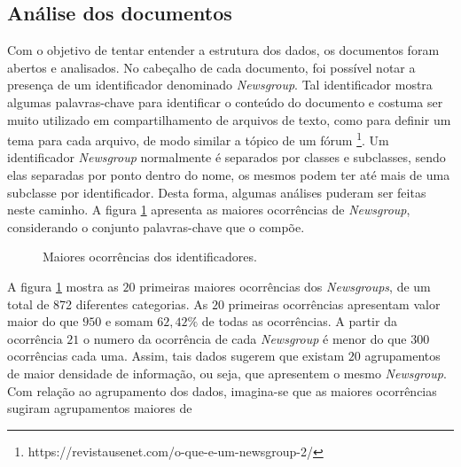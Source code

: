 \documentclass[conference]{IEEEtran}
\begin{document}
\subsection{Análise dos documentos}

Com o objetivo de tentar entender a estrutura dos dados, os documentos foram abertos e analisados. No cabeçalho de cada documento, foi possível notar a presença de um identificador denominado \emph{Newsgroup}. Tal identificador mostra algumas palavras-chave para identificar o conteúdo do documento e costuma ser muito utilizado em compartilhamento de arquivos de texto, como para definir um tema para cada arquivo, de modo similar a tópico de um fórum \footnote{https://revistausenet.com/o-que-e-um-newsgroup-2/}. Um identificador \emph{Newsgroup} normalmente é separados por classes e subclasses, sendo elas separadas por ponto dentro do nome, os mesmos podem ter até mais de uma subclasse por identificador. Desta forma, algumas análises puderam ser feitas neste caminho. A figura \ref{fig:occurrence} apresenta as maiores ocorrências de \emph{Newsgroup}, considerando o conjunto palavras-chave que o compõe.

\begin{figure}[!h]
	\centering
	{
	}
	\caption{\small Maiores ocorrências dos identificadores.}
	\label{fig:occurrence}
\end{figure}

A figura \ref{fig:occurrence} mostra as $20$ primeiras maiores ocorrências dos \emph{Newsgroups}, de um total de 872 diferentes categorias. As $20$ primeiras ocorrências apresentam valor maior do que $950$ e somam $62,42\%$ de todas as ocorrências. A partir da ocorrência $21$ o numero da ocorrência de cada \emph{Newsgroup} é menor do que $300$ ocorrências cada uma. Assim, tais dados sugerem que existam $20$ agrupamentos de maior densidade de informação, ou seja, que apresentem o mesmo \emph{Newsgroup}. Com relação ao agrupamento dos dados, imagina-se que as maiores ocorrências sugiram agrupamentos maiores de
\end{document}
